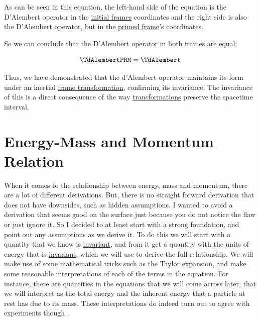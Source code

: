 \begin{derivation}
	As can be seen in this equation, the left-hand side of the equation is the D'Alembert operator in the \hyperlink{def-initial-Frame}{initial frames} coordinates and the right side is also the D'Alembert operator, but in the \hyperlink{def-Primed-Frame}{primed frame}'s coordinates.

	So we can conclude that the D'Alembert operator in both frames are equal:

	\begin{equation}
		\TdAlembertPRM  = \TdAlembert
	\end{equation}

\end{derivation}

Thus, we have demonstrated that the d'Alembert operator maintains its form under an inertial \hyperlink{def-transform}{frame transformation}, confirming its invariance.
The invariance of this is a direct consequence of the way \hyperlink{def-transform}{transformations} preserve the spacetime interval.

\section{Energy-Mass and Momentum Relation} \label{sect: Energy-Mass and Momentum Relation}

When it comes to the relationship between energy, mass and momentum, there are a lot of different derivations.
But, there is no straight forward derivation that does not have downsides, such as hidden assumptions.
I wanted to avoid a derivation that seems good on the surface just because you do not notice the flaw or just ignore it.
So I decided to at least start with a strong foundation, and point out any assumptions as we derive it.
To do this we will start with a quantity that we know is \hyperlink{def-lorentz-invariant}{invariant}, and from it get a quantity with the units of energy that is \hyperlink{def-lorentz-invariant}{invariant}, which we will use to derive the full relationship.
We will make use of some mathematical tricks such as the Taylor expansion, and make some reasonable interpretations of each of the terms in the equation.
For instance, there are quantities in the equations that we will come across later, that we will interpret as the total energy and the inherent energy that a particle at rest has due to its mass.
These interpretations do indeed turn out to agree with experiments though \cite{SRtestsWiki,SRtestsUniCR}.

